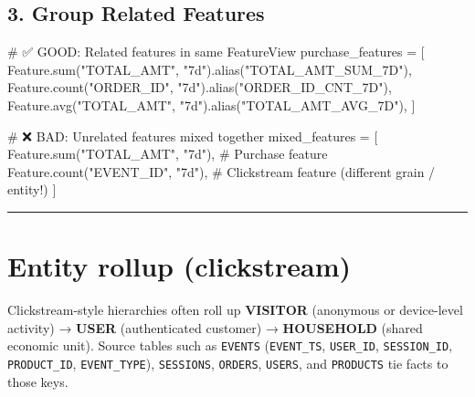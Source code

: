 \documentclass[
  letterpaper,
  DIV=11,
  numbers=noendperiod]{scrreprt}
\newenvironment{Shaded}{\begin{snugshade}}{\end{snugshade}}
\newcommand{\BuiltInTok}[1]{\textcolor[rgb]{0.00,0.23,0.31}{#1}}
\newcommand{\CommentTok}[1]{\textcolor[rgb]{0.37,0.37,0.37}{#1}}
\newcommand{\NormalTok}[1]{\textcolor[rgb]{0.00,0.23,0.31}{#1}}
\newcommand{\OperatorTok}[1]{\textcolor[rgb]{0.37,0.37,0.37}{#1}}
\newcommand{\StringTok}[1]{\textcolor[rgb]{0.13,0.47,0.30}{#1}}
\begin{document}
\hypertarget{group-related-features}{%
\subsection{3. Group Related Features}\label{group-related-features}}

\begin{Shaded}
\begin{Highlighting}[]
\CommentTok{\# ✅ GOOD: Related features in same FeatureView}
\NormalTok{purchase\_features }\OperatorTok{=}\NormalTok{ [}
\NormalTok{    Feature.}\BuiltInTok{sum}\NormalTok{(}\StringTok{"TOTAL\_AMT"}\NormalTok{, }\StringTok{"7d"}\NormalTok{).alias(}\StringTok{"TOTAL\_AMT\_SUM\_7D"}\NormalTok{),}
\NormalTok{    Feature.count(}\StringTok{"ORDER\_ID"}\NormalTok{, }\StringTok{"7d"}\NormalTok{).alias(}\StringTok{"ORDER\_ID\_CNT\_7D"}\NormalTok{),}
\NormalTok{    Feature.avg(}\StringTok{"TOTAL\_AMT"}\NormalTok{, }\StringTok{"7d"}\NormalTok{).alias(}\StringTok{"TOTAL\_AMT\_AVG\_7D"}\NormalTok{),}
\NormalTok{]}

\CommentTok{\# ❌ BAD: Unrelated features mixed together}
\NormalTok{mixed\_features }\OperatorTok{=}\NormalTok{ [}
\NormalTok{    Feature.}\BuiltInTok{sum}\NormalTok{(}\StringTok{"TOTAL\_AMT"}\NormalTok{, }\StringTok{"7d"}\NormalTok{),  }\CommentTok{\# Purchase feature}
\NormalTok{    Feature.count(}\StringTok{"EVENT\_ID"}\NormalTok{, }\StringTok{"7d"}\NormalTok{),  }\CommentTok{\# Clickstream feature (different grain / entity!)}
\NormalTok{]}
\end{Highlighting}
\end{Shaded}

\begin{center}\rule{0.5\linewidth}{0.5pt}\end{center}

\hypertarget{sec-rollup}{%
\section{Entity rollup (clickstream)}\label{sec-rollup}}

Clickstream-style hierarchies often roll up \textbf{VISITOR} (anonymous
or device-level activity) → \textbf{USER} (authenticated customer) →
\textbf{HOUSEHOLD} (shared economic unit). Source tables such as
\texttt{EVENTS} (\texttt{EVENT\_TS}, \texttt{USER\_ID},
\texttt{SESSION\_ID}, \texttt{PRODUCT\_ID}, \texttt{EVENT\_TYPE}),
\texttt{SESSIONS}, \texttt{ORDERS}, \texttt{USERS}, and
\texttt{PRODUCTS} tie facts to those keys.
\end{document}
